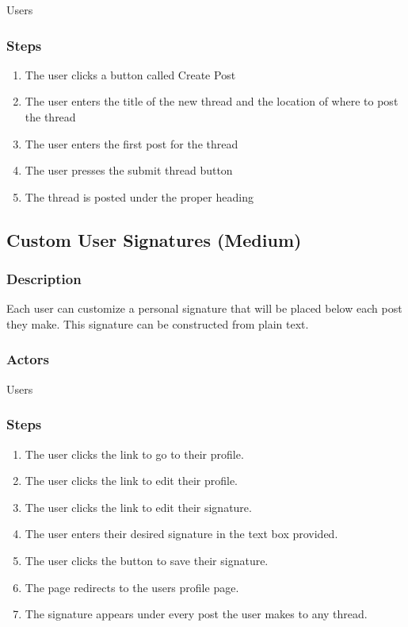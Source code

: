 \documentclass[12pt]{scrartcl}
\begin{document}
Users

\subsubsection{Steps}

\begin{enumerate}
\item The user clicks a button called Create Post 
\item The user enters the title of the new thread and the location of where to post the thread
\item The user enters the first post for the thread
\item The user presses the submit thread button
\item The thread is posted under the proper heading
\end{enumerate}

\subsection{Custom User Signatures (Medium)}
\subsubsection{Description}

Each user can customize a personal signature that will be placed below each post they make. This signature can be constructed from plain text.

\subsubsection{Actors}

Users

\subsubsection{Steps}

\begin{enumerate}
\item The user clicks the link to go to their profile.
\item The user clicks the link to edit their profile.
\item The user clicks the link to edit their signature.
\item The user enters their desired signature in the text box provided.
\item The user clicks the button to save their signature.
\item The page redirects to the users profile page.
\item The signature appears under every post the user makes to any thread.
\end{enumerate}
\end{document}
